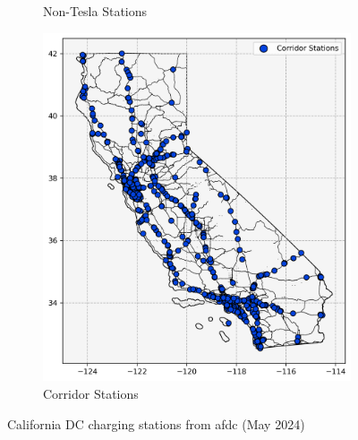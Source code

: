 \begin{figure}[H]
\begin{subfigure}{\linewidth/3}
	\caption{Non-Tesla Stations}
\end{subfigure}
\begin{subfigure}{\linewidth/3}
	\centering
	\includegraphics[width = \linewidth]{figs/California_SNG_Corridor.png}
	\caption{Corridor Stations}
\end{subfigure}
\caption{California DC charging stations from \gls{afdc} (May 2024)}
\label{fig:california_stations}
\end{figure}

